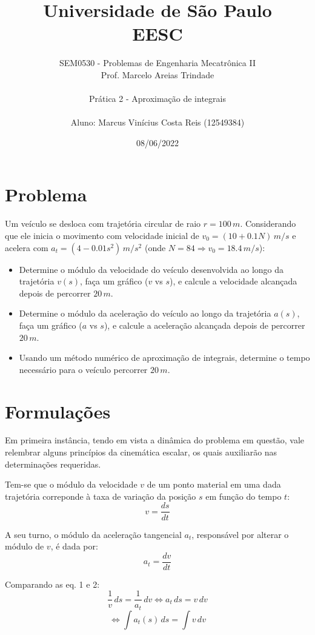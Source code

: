 \documentclass[a4paper, 12pt]{article}
\title{Universidade de São Paulo \\ EESC}
\author{SEM0530 - Problemas de Engenharia Mecatrônica II \\ 
Prof. Marcelo Areias Trindade \\ \\ Prática 2 - Aproximação de integrais
\\ \\ Aluno: Marcus Vinícius Costa Reis (12549384)}
\date{08/06/2022}
\begin{document}
	\maketitle \newpage \tableofcontents \newpage
	
	\section{Problema}
	
	Um veículo se desloca com trajetória circular de raio $r=100\,m$. Considerando que ele inicia o movimento com velocidade 
	inicial de $v_0=(10+0.1N)\,m/s$ e acelera com $a_t=(4-0.01s^2)\,m/s^2$ (onde $N=84\Rightarrow v_0=18.4\,m/s$):
	
	\begin{itemize}
		\item Determine o módulo da velocidade do veículo desenvolvida ao longo da trajetória $v(s)$, faça um gráfico 
		($v$ vs $s$), e calcule a velocidade alcançada depois de percorrer $20\,m$.
		\item Determine o módulo da aceleração do veículo ao longo da trajetória $a(s)$, faça um gráfico ($a$ vs $s$), e 
		calcule a aceleração alcançada depois de percorrer $20\,m$.
		\item Usando um método numérico de aproximação de integrais, determine o tempo necessário para o veículo 
		percorrer $20\,m$.
	\end{itemize}
	
	\section{Formulações}
	
	Em primeira instância, tendo em vista a dinâmica do problema em questão, vale relembrar alguns princípios da cinemática
	escalar, os quais auxiliarão nas determinações requeridas.
	
	Tem-se que o módulo da velocidade $v$ de um ponto material em uma dada trajetória correponde à taxa de variação da 
	posição $s$ em função do tempo $t$: \begin{equation} v=\dfrac{ds}{dt}	
	\end{equation}
	
	A seu turno, o módulo da aceleração tangencial $a_t$, responsável por alterar o módulo de $v$, é dada por: 
	\begin{equation} 
		a_t=\dfrac{dv}{dt}
	\end{equation}				
	
	Comparando as eq. 1 e 2:
	$$\dfrac{1}{v}\,ds=\dfrac{1}{a_t}\,dv \Longleftrightarrow a_t\,ds=v\,dv$$ 
	\begin{equation}
		\Longleftrightarrow \int a_t(s)\,ds=\int v\,dv
	\end{equation}		
	
\end{document}
